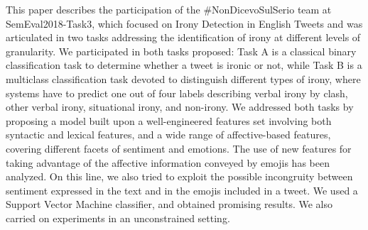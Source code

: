 This paper describes the participation of the \#NonDicevoSulSerio team at SemEval2018-Task3, which focused on Irony Detection in English Tweets and was articulated in two tasks addressing the identification of irony at different levels of granularity. We participated in both tasks proposed: Task A is a classical binary classification task to determine whether a tweet is ironic or not, while Task B is a multiclass classification task devoted to distinguish different types of irony, where systems have to predict one out of four labels describing verbal irony by clash, other verbal irony, situational irony, and non-irony. We addressed both tasks by proposing a model built upon a well-engineered features set involving both syntactic and lexical features, and a wide range of affective-based features, covering different facets of sentiment and emotions. The use of new features for taking advantage of the affective information conveyed by emojis has been analyzed. On this line, we also tried to exploit the possible incongruity between sentiment expressed in the text and in the emojis included in a tweet. We used a Support Vector Machine classifier, and obtained promising results. We also carried on experiments in an unconstrained setting.
